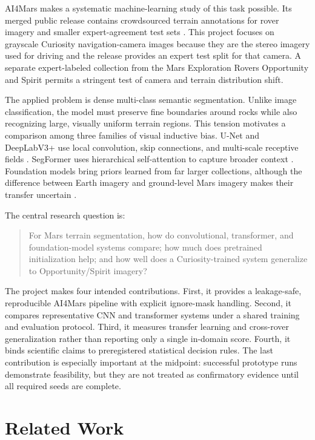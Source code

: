\documentclass[11pt]{article}
\begin{document}
AI4Mars makes a systematic machine-learning study of this task possible. Its merged public release
contains crowdsourced terrain annotations for rover imagery and smaller expert-agreement test sets
\cite{swan2021ai4mars,ai4marszenodo}. This project focuses on grayscale Curiosity navigation-camera
images because they are the stereo imagery used for driving and the release provides an expert test
split for that camera. A separate expert-labeled collection from the Mars Exploration Rovers
Opportunity and Spirit permits a stringent test of camera and terrain distribution shift.

The applied problem is dense multi-class semantic segmentation. Unlike image classification, the
model must preserve fine boundaries around rocks while also recognizing large, visually uniform
terrain regions. This tension motivates a comparison among three families of visual inductive bias.
U-Net and DeepLabV3+ use local convolution, skip connections, and multi-scale receptive fields
\cite{ronneberger2015unet,chen2018deeplab}. SegFormer uses hierarchical self-attention to capture
broader context \cite{xie2021segformer}. Foundation models bring priors learned from far larger
collections, although the difference between Earth imagery and ground-level Mars imagery makes
their transfer uncertain \cite{kirillov2023sam,simeoni2025dinov3}.

The central research question is:

\begin{quote}
For Mars terrain segmentation, how do convolutional, transformer, and foundation-model systems
compare; how much does pretrained initialization help; and how well does a Curiosity-trained system
generalize to Opportunity/Spirit imagery?
\end{quote}

The project makes four intended contributions. First, it provides a leakage-safe, reproducible
AI4Mars pipeline with explicit ignore-mask handling. Second, it compares representative CNN and
transformer systems under a shared training and evaluation protocol. Third, it measures transfer
learning and cross-rover generalization rather than reporting only a single in-domain score. Fourth,
it binds scientific claims to preregistered statistical decision rules. The last contribution is
especially important at the midpoint: successful prototype runs demonstrate feasibility, but they
are not treated as confirmatory evidence until all required seeds are complete.

\section{Related Work}
\end{document}
